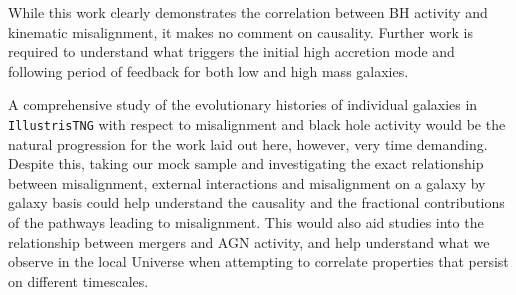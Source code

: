 While this work clearly demonstrates the correlation between BH activity and kinematic misalignment, it makes no comment on causality. Further work is required to understand what triggers the initial high accretion mode and following period of feedback for both low and high mass galaxies.

A comprehensive study of the evolutionary histories of individual galaxies in \texttt{IllustrisTNG} with respect to misalignment and black hole activity would be the natural progression for the work laid out here, however, very time demanding. Despite this, taking our mock sample and investigating the exact relationship between misalignment, external interactions and misalignment on a galaxy by galaxy basis could help understand the causality and the fractional contributions of the pathways leading to misalignment. This would also aid studies into the relationship between mergers and AGN activity, and help understand what we observe in the local Universe when attempting to correlate properties that persist on different timescales.
